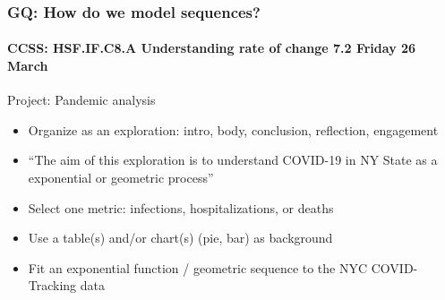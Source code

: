 \documentclass{beamer}
\begin{document}
\frame
{
  \frametitle{GQ: How do we model sequences?}
  \framesubtitle{CCSS: HSF.IF.C8.A Understanding rate of change \hfill \alert{7.2 Friday 26 March}}

  \begin{block}{Project: Pandemic analysis}
    \begin{itemize}
      \item Organize as an exploration: intro, body, conclusion, reflection, engagement
      \item ``The aim of this exploration is to understand COVID-19 in NY State as a exponential or geometric process''
      \item Select one metric: infections, hospitalizations, or deaths
      \item Use a table(s) and/or chart(s) (pie, bar) as background
      \item Fit an exponential function / geometric sequence to the NYC COVID-Tracking data
    \end{itemize}
    \end{block}
    }
\end{document}
